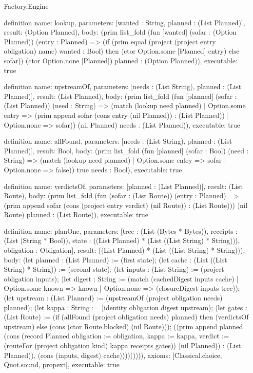 \begin{lexlean}{Factory.Engine}
\begin{semanticmodule}
definition{
  name: lookup,
  parameters: [wanted : String, planned : (List Planned)],
  result: (Option Planned),
  body: (prim list_fold (fun [wanted] (sofar : (Option Planned)) (entry : Planned) => (if (prim equal (project (project entry obligation) name) wanted : Bool) then (ctor Option.some [Planned] entry) else sofar)) (ctor Option.none [Planned]) planned : (Option Planned)),
  executable: true
}

definition{
  name: upstreamOf,
  parameters: [needs : (List String), planned : (List Planned)],
  result: (List Planned),
  body: (prim list_fold (fun [planned] (sofar : (List Planned)) (need : String) => (match (lookup need planned)
      | Option.some entry => (prim append sofar (cons entry (nil Planned)) : (List Planned))
      | Option.none => sofar)) (nil Planned) needs : (List Planned)),
  executable: true
}

definition{
  name: allFound,
  parameters: [needs : (List String), planned : (List Planned)],
  result: Bool,
  body: (prim list_fold (fun [planned] (sofar : Bool) (need : String) => (match (lookup need planned)
      | Option.some entry => sofar
      | Option.none => false)) true needs : Bool),
  executable: true
}

definition{
  name: verdictsOf,
  parameters: [planned : (List Planned)],
  result: (List Route),
  body: (prim list_fold (fun (sofar : (List Route)) (entry : Planned) => (prim append sofar (cons (project entry verdict) (nil Route)) : (List Route))) (nil Route) planned : (List Route)),
  executable: true
}

definition{
  name: planOne,
  parameters: [tree : (List (Bytes * Bytes)), receipts : (List (String * Bool)), state : ((List Planned) * (List ((List String) * String))), obligation : Obligation],
  result: ((List Planned) * (List ((List String) * String))),
  body: (let planned : (List Planned) := (first state); (let cache : (List ((List String) * String)) := (second state); (let inputs : (List String) := (project obligation inputs); (let digest : String := (match (cachedDigest inputs cache)
      | Option.some known => known
      | Option.none => (closureDigest inputs tree)); (let upstream : (List Planned) := (upstreamOf (project obligation needs) planned); (let kappa : String := (identity obligation digest upstream); (let gates : (List Route) := (if (allFound (project obligation needs) planned) then (verdictsOf upstream) else (cons (ctor Route.blocked) (nil Route))); ((prim append planned (cons (record Planned {obligation := obligation, kappa := kappa, verdict := (routeFor (project obligation kind) kappa receipts gates)}) (nil Planned)) : (List Planned)), (cons (inputs, digest) cache))))))))),
  axioms: [Classical.choice, Quot.sound, propext],
  executable: true
}


\end{semanticmodule}
\end{lexlean}
